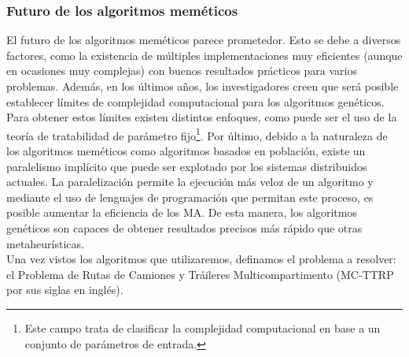 \subsubsection{Futuro de los algoritmos meméticos}
El futuro de los algoritmos meméticos parece prometedor. Esto se debe a diversos factores, como la existencia de múltiples implementaciones muy eficientes (aunque en ocasiones muy complejas) con buenos resultados prácticos para varios problemas. Además, en los últimos años, los investigadores creen que será posible establecer límites de complejidad computacional para los algoritmos genéticos. Para obtener estos límites existen distintos enfoques, como puede ser el uso de la teoría de tratabilidad de parámetro fijo\footnote{Este campo trata de clasificar la complejidad computacional en base a un conjunto de parámetros de entrada.}. Por último, debido a la naturaleza de los algoritmos meméticos como algoritmos basados en población, existe un paralelismo implícito que puede ser explotado por los sistemas distribuidos actuales. La paralelización permite la ejecución más veloz de un algoritmo y mediante el uso de lenguajes de programación que permitan este proceso, es posible aumentar la eficiencia de los MA. De esta manera, los algoritmos genéticos son capaces de obtener resultados precisos más rápido que otras metaheurísticas.\\

Una vez vistos los algoritmos que utilizaremos, definamos el problema a resolver: el Problema de Rutas de Camiones y Tráileres Multicompartimento (MC-TTRP por sus siglas en inglés).